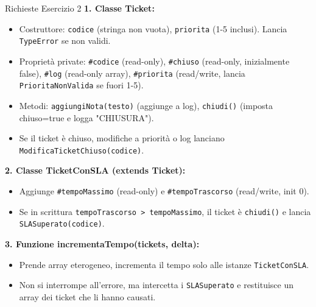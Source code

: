\begin{definition}{Richieste Esercizio 2}
\textbf{1. Classe Ticket:}
\begin{itemize}
    \item Costruttore: \texttt{codice} (stringa non vuota), \texttt{priorita} (1-5 inclusi). Lancia \texttt{TypeError} se non validi.
    \item Proprietà private: \texttt{\#codice} (read-only), \texttt{\#chiuso} (read-only, inizialmente false), \texttt{\#log} (read-only array), \texttt{\#priorita} (read/write, lancia \texttt{PrioritaNonValida} se fuori 1-5).
    \item Metodi: \texttt{aggiungiNota(testo)} (aggiunge a log), \texttt{chiudi()} (imposta chiuso=true e logga "CHIUSURA").
    \item Se il ticket è chiuso, modifiche a priorità o log lanciano \texttt{ModificaTicketChiuso(codice)}.
\end{itemize}
\textbf{2. Classe TicketConSLA (extends Ticket):}
\begin{itemize}
    \item Aggiunge \texttt{\#tempoMassimo} (read-only) e \texttt{\#tempoTrascorso} (read/write, init 0).
    \item Se in scrittura \texttt{tempoTrascorso > tempoMassimo}, il ticket è \texttt{chiudi()} e lancia \texttt{SLASuperato(codice)}.
\end{itemize}
\textbf{3. Funzione incrementaTempo(tickets, delta):}
\begin{itemize}
    \item Prende array eterogeneo, incrementa il tempo solo alle istanze \texttt{TicketConSLA}.
    \item Non si interrompe all'errore, ma intercetta i \texttt{SLASuperato} e restituisce un array dei ticket che li hanno causati.
\end{itemize}
\end{definition}

